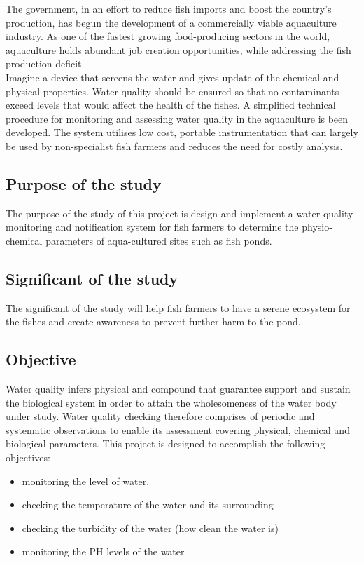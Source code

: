 \documentclass[12pt]{article}
\begin{document}
The government, in an effort to reduce fish imports and boost the country’s production, has begun the development of a commercially viable aquaculture industry. As one of the fastest growing food-producing sectors in the world, aquaculture holds abundant job creation opportunities, while addressing the fish production deficit.\\

Imagine a device that screens the water and gives update of the chemical and physical properties. Water quality should be ensured so that no contaminants exceed levels that would affect the health of the fishes. A simplified technical procedure for monitoring and assessing water quality in the aquaculture is been developed. The system utilises low cost, portable instrumentation that can largely be used by non-specialist fish farmers and reduces the need for costly analysis.\\

		\subsection*{Purpose of the study}
		The purpose of the study of this project is design and implement a water quality monitoring and notification system for fish farmers to determine the physio-chemical parameters of aqua-cultured sites such as fish ponds.
		
		\subsection*{Significant of the study}
		The significant of the study will help fish farmers to have a serene ecosystem for the fishes and create awareness to prevent further harm to the pond.

		\subsection*{Objective }
		Water quality infers physical and compound that guarantee support and sustain the biological system in order to attain the wholesomeness of the water body under study. Water quality checking therefore comprises of periodic and systematic observations to enable its assessment covering physical, chemical and biological parameters. This project is designed to accomplish the following objectives: 
			\begin{itemize}
				\item 	monitoring the level of water.
				\item 	checking the temperature of the water and its surrounding
				\item   checking the turbidity of the water (how clean the water is)
				\item	monitoring the PH levels of the water
			\end{itemize}
	
\end{document}
